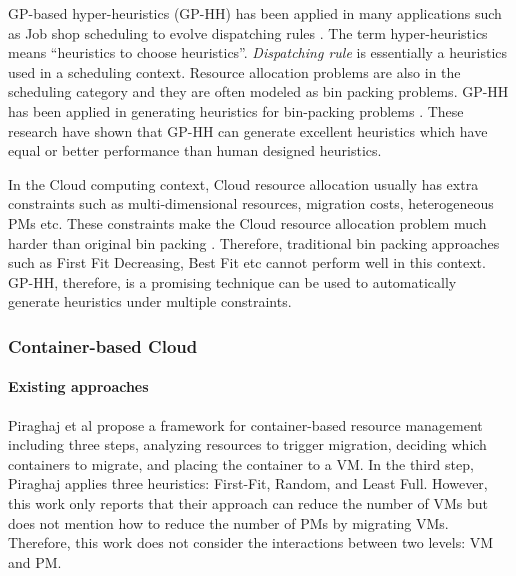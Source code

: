 GP-based hyper-heuristics (GP-HH)  has been applied in many applications such as Job shop scheduling to evolve dispatching rules \cite{Nguyen:2014eu}. The term hyper-heuristics \cite{Cowling:2000ek} means ``heuristics to choose heuristics''.
\emph{Dispatching rule} is essentially a heuristics \cite{Panwalkar:1977fw} used in a scheduling context. 
Resource allocation problems are also in the scheduling category and they are often modeled as bin packing problems. 
GP-HH has been applied in generating heuristics for bin-packing problems \cite{Poli:2007kt,Sim:2013fe,Burke:2012gs}. These research have shown that GP-HH can generate excellent heuristics which have equal or better performance than human designed heuristics.

In the Cloud computing context,  Cloud resource allocation usually has extra constraints such as multi-dimensional resources, migration costs, heterogeneous PMs etc. These constraints make the Cloud resource allocation problem much harder than original bin packing \cite{Mann:2015ua}. Therefore, traditional bin packing approaches such as First Fit Decreasing, Best Fit etc cannot perform well in this context.  GP-HH, therefore, is a promising technique can be used to automatically generate heuristics under multiple constraints.

\subsubsection{Container-based Cloud}
\paragraph{Existing approaches}
Piraghaj et al \cite{Piraghaj:2015dv} propose a framework for container-based resource management including three steps, analyzing resources to trigger migration, deciding which containers to migrate, and placing the container to a VM. In the third step, Piraghaj applies three heuristics: First-Fit, Random, and Least Full. However, this work only reports that their approach can reduce the number of VMs but does not mention how to reduce the number of PMs by migrating VMs. Therefore, this work does not consider the interactions between two levels: VM and PM. 


